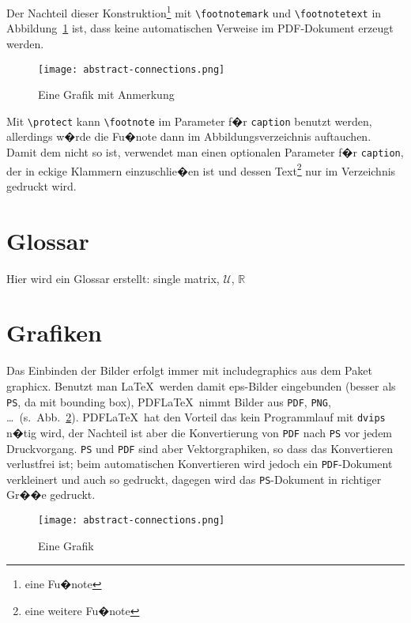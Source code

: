 Der Nachteil dieser Konstruktion\footnote{eine Fu�note} mit
\lstinline!\footnotemark! und \lstinline!\footnotetext! in
Abbildung~\ref{fig:footgrafik} ist, dass keine automatischen Verweise im
PDF-Dokument erzeugt werden.
%
\begin{figure}[H]
  \centering
  \texttt{[image: abstract-connections.png]}
  \caption[Eine Grafik mit Anmerkung]%
  {Eine Grafik mit Anmerkung\protect\footnotemark}
  \label{fig:footgrafik}
\end{figure}
%
Mit \lstinline!\protect!
kann \lstinline!\footnote! im Parameter f�r \lstinline!caption! benutzt werden,
allerdings w�rde die Fu�note dann im Abbildungsverzeichnis auftauchen. Damit
dem nicht so ist, verwendet man einen optionalen Parameter f�r
\lstinline!caption!, der in eckige Klammern einzuschlie�en
ist und dessen Text\footnote{eine weitere Fu�note} nur im Verzeichnis gedruckt wird.


\section{Glossar}
\label{sec:glossary}

Hier wird ein Glossar erstellt: single matrix,  $\mathcal{U}$,
$\mathbb{R}$ 


\section{Grafiken}

Das Einbinden der Bilder erfolgt immer mit includegraphics aus dem Paket
graphicx. Benutzt man \LaTeX\ werden damit eps-Bilder eingebunden (besser als
\texttt{PS}, da mit bounding box), PDF\LaTeX\ nimmt Bilder aus \texttt{PDF},
\texttt{PNG}, \ldots\ (s.~Abb.~\ref{fig:grafik}). PDF\LaTeX\ hat den Vorteil das kein Programmlauf mit
\texttt{dvips} n�tig wird, der Nachteil ist aber die Konvertierung von
\texttt{PDF} nach \texttt{PS} vor jedem Druckvorgang. \texttt{PS} und
\texttt{PDF} sind aber Vektorgraphiken, so dass das Konvertieren verlustfrei
ist; beim automatischen Konvertieren wird jedoch ein \texttt{PDF}-Dokument
verkleinert und auch so gedruckt, dagegen wird das \texttt{PS}-Dokument in
richtiger Gr��e gedruckt.


\begin{figure}
  \centering
  \texttt{[image: abstract-connections.png]}
  \caption{Eine Grafik}
  \label{fig:grafik}
\end{figure}


